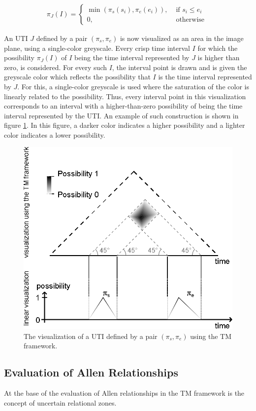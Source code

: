 \begin{align}
\pi_J(I) = \begin{cases}
 \min \left(\pi_s (s_i), \pi_e (e_i) \right), & \mbox{ if } s_i \leq e_i\\
0, & \mbox{ otherwise }
\end{cases}
\end{align}

An UTI $J$ defined by a pair $(\pi_s, \pi_e)$ is now visualized as an area in the image plane, using a single-color greyscale. Every crisp time interval $I$ for which the possibility $\pi_J(I)$ of $I$ being the time interval represented by $J$ is higher than zero, is considered. For every such $I$, the interval point is drawn and is given the greyscale color which reflects the possibility that $I$ is the time interval represented by $J$. For this, a single-color greyscale is used where the saturation of the color is linearly related to the possibility. Thus, every interval point in this visualization corresponds to an interval with a higher-than-zero possibility of being the time interval represented by the UTI. An example of such construction is shown in figure \ref{fig:tm-ill-const-ex}. In this figure, a darker color indicates a higher possibility and a lighter color indicates a lower possibility.

\begin{figure}[h]
	\centering
	\includegraphics[width=0.8\columnwidth]{graphs/TM_model_ill_known.eps}
	\caption{The visualization of a UTI defined by a pair $(\pi_s, \pi_e)$ using the TM framework.}
	\label{fig:tm-ill-const-ex}
\end{figure}

\subsection{\label{subsec:tm-evaluation}Evaluation of Allen Relationships}
At the base of the evaluation of Allen relationships in the TM framework is the concept of uncertain relational zones.

